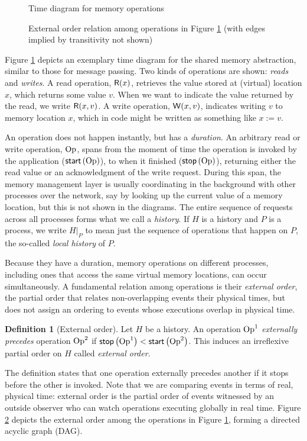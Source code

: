 \documentclass[]             %
{NASA}                       %
\theoremstyle{definition}
\newtheorem{definition}[theorem]{Definition}
\begin{document}
\begin{figure}
    \centering
    
    \caption{Time diagram for memory operations}
    \label{fig:dsm-example-1}
\end{figure}

\begin{figure}
  \centering
  
  \caption{External order relation among operations in Figure \ref{fig:dsm-example-1} (with edges implied by transitivity not shown)}
  \label{fig:dsm-example-1-DAG}
\end{figure}

Figure \ref{fig:dsm-example-1} depicts an exemplary time diagram for
the shared memory abstraction, similar to those for message
passing. Two kinds of operations are shown: \emph{reads} and
\emph{writes}. A read operation, $\mathsf{R}\!\left(x\right)$, retrieves the value
stored at (virtual) location $x$, which returns some value $v$. When
we want to indicate the value returned by the read, we write
$\mathsf{R}\!\left(x, v\right)$. A write operation, $\mathsf{W}\!\left(x, v\right)$, indicates
writing $v$ to memory location $x$, which in code might be written as
something like $x := v$.

An operation does not happen instantly, but has a \emph{duration}. An
arbitrary read or write operation, $\mathrm{Op}$, spans from the moment of
time the operation is invoked by the application ($\mathsf{start}\left(\mathrm{Op}\right)$),
to when it finished ($\mathsf{stop}\left(\mathrm{Op}\right)$), returning either the read value
or an acknowledgment of the write request. During this span, the
memory management layer is usually coordinating in the background with
other processes over the network, say by looking up the current value
of a memory location, but this is not shown in the diagrams. The
entire sequence of requests across all processes forms what we call a
\emph{history}. If $H$ is a history and $P$ is a process, we write
$H|_P$ to mean just the sequence of operations that happen on $P$, the
so-called \emph{local history} of $P$.

Because they have a duration, memory operations on different
processes, including ones that access the same virtual memory
locations, can occur simultaneously. A fundamental relation among
operations is their \emph{external order}, the partial order that
relates non-overlapping events their physical times, but does not
assign an ordering to events whose executions overlap in physical
time.
\begin{definition}[External order]
  \label{def:external-order}
  Let $H$ be a history. An operation $\mathrm{Op}^1$ \emph{externally
    precedes} operation $\mathrm{Op}^2$ if
  $\mathsf{stop}\left(\mathrm{Op}^1\right) < \mathsf{start}\left(\mathrm{Op}^2\right)$. This induces an irreflexive
  partial order on $H$ called \emph{external order}.
\end{definition}
The definition states that one operation externally precedes another
if it stops before the other is invoked. Note that we are comparing
events in terms of real, physical time: external order is the partial
order of events witnessed by an outside observer who can watch
operations executing globally in real time. Figure
\ref{fig:dsm-example-1-DAG} depicts the external order among the
operations in Figure \ref{fig:dsm-example-1}, forming a directed
acyclic graph (DAG).
\end{document}

